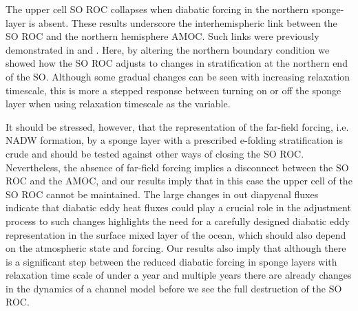 The upper cell SO ROC collapses when diabatic forcing in the northern sponge-layer is absent. 
These results underscore the interhemispheric link between the SO ROC and the northern hemisphere AMOC. Such links were previously demonstrated in \citet{Gnanadesikan2000} and \citet{Wolfe2011}. Here, by altering the northern boundary condition we showed how the SO ROC adjusts to changes in stratification at the northern end of the SO. Although some gradual changes can be seen with increasing relaxation timescale, this is more a stepped response between turning on or off the sponge layer when using relaxation timescale as the variable.  

It should be stressed, however, that the representation of the far-field forcing, i.e. NADW formation, by a sponge layer with a prescribed e-folding stratification is crude and should be tested against other ways of closing the SO ROC. Nevertheless, the absence of far-field forcing implies a disconnect between the SO ROC and the AMOC, and our results imply that in this case the upper cell of the SO ROC cannot be maintained. The large changes in out diapycnal fluxes indicate that diabatic eddy heat fluxes could play a crucial role in the adjustment process to such changes highlights the need for a carefully designed diabatic eddy representation in the surface mixed layer of the ocean, which should also depend on the atmospheric state and forcing. Our results also imply that although there is a significant step between the reduced diabatic forcing in sponge layers with relaxation time scale of under a year and multiple years there are already changes in the dynamics of a channel model before we see the full destruction of the SO ROC.





